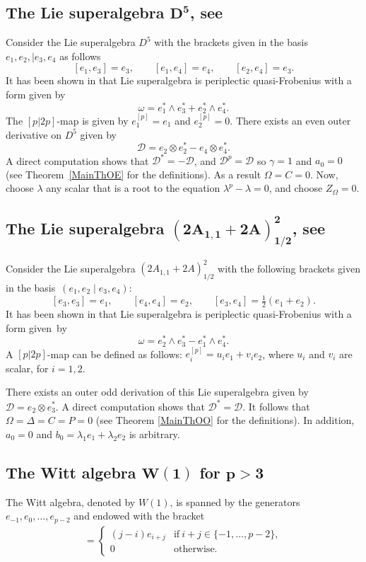 \documentclass[10pt,a4paper]{amsart}
\numberwithin{equation}{section}
\begin{document}
\subsection[The Lie superalgebra D\^{}5, see \protect{[2]}]{The Lie superalgebra $\boldsymbol{D^5}$, see \cite{Ba}}
Consider the Lie superalgebra $D^5$ with the brackets given in the basis $e_1, e_2, \mid e_3, e_4$ as follows
\[
[e_1, e_3]=e_3, \qquad [e_1, e_4]=e_4, \qquad [e_2, e_4]=e_3.
\]
It has been shown in \cite{BM} that Lie superalgebra is periplectic quasi-Frobenius with a form given by
\[
\omega=e_1^*\wedge e_3^*+e_2^*\wedge e_4^*.
\]
The $[p|2p]$-map is given by $
e_1^{[p]}=e_1$ and $e_2^{[p]}=0$. There exists an even outer derivative on $D^5$ given by
\[
{\mathscr D}=e_2\otimes e_2^*-e_4\otimes e_4^*.
\]
A direct computation shows that ${\mathscr D}^*=-{\mathscr D}$, and ${\mathscr D}^p={\mathscr D}$ so $\gamma=1$ and $a_0=0$ (see Theorem~\ref{MainThOE} for the definitions). As a result $\Omega=C=0$. Now, choose $\lambda$ any scalar that is a root to the equation $\lambda^p-\lambda=0$, and choose $Z_\Omega= 0$.
\subsection[The Lie superalgebra (2A\_\{1,1\}+2A)\^{}2\_\{1/2\}, see \protect{[2]}]{The Lie superalgebra $\boldsymbol{(2A_{1,1}+2A)^2_{1/2}}$, see \cite{Ba}}
Consider the Lie superalgebra $(2A_{1,1}+2A)^2_{1/2}$ with the following brackets given in the basis~$(e_1, e_2 \mid e_3, e_4)$:
\[
[e_3, e_3]=e_1, \qquad [e_4, e_4]=e_2, \qquad [e_3, e_4]=\tfrac{1}{2}(e_1+e_2).
\]
It has been shown in \cite{BM} that Lie superalgebra is periplectic quasi-Frobenius with a form given~by
\[
\omega=e_2^*\wedge e_3^*-e_1^*\wedge e_4^*.
\]
A $[p|2p]$-map can be defined as follows: $e_i^{[p]}=u_{i} e_1 + v_{i} e_2$, where $u_i$ and $v_i$ are scalar, for $i=1,2$.

There exists an outer odd derivation of this Lie superalgebra given by ${\mathscr D}=e_2\otimes e_3^*$. A direct computation shows that ${\mathscr D}^*={\mathscr D}$. It follows that $\Omega = \Delta= C=P=0$ (see Theorem \ref{MainThOO} for the definitions). In addition, $a_0=0$ and $b_0=\lambda_1 e_1+\lambda_2 e_2$ is arbitrary.

\subsection[The Witt algebra W(1) for p>3]{The Witt algebra $\boldsymbol{W(1)}$ for $\boldsymbol{p>3}$}
The Witt algebra, denoted by $W(1)$, is spanned by the generators $e_{-1},e_0,\dots ,e_{p-2}$ and endowed with the bracket
\begin{gather*}	
[e_i,e_j]=
 \begin{cases}
		(j-i)e_{i+j} &\text{if}\ i+j\in\{-1,\dots ,p-2\},\\
		0 &\text{otherwise.}
	\end{cases}
\end{gather*}
	
\end{document}
